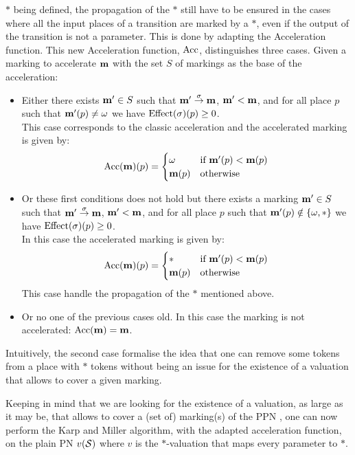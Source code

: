 $*$ being defined, the propagation of the $*$ still have to be ensured in the cases where all the input places of a transition are marked by a $*$, even if the output of the transition is not a parameter.
This is done by adapting the Acceleration function.
This new Acceleration function, $\operatorname{Acc}$, distinguishes three cases.
Given a marking to accelerate $\mathbf{m}$ with the set $S$ of markings as the base of the acceleration:
\begin{itemize}
  \item Either there exists $\mathbf{m'} \in S$ such that $\mathbf{m'} \stackrel{\sigma}{\to} \mathbf{m}$, $\mathbf{m'} < \mathbf{m}$, and for all place $p$ such that $\mathbf{m'}(p) \neq \omega$ we have $\operatorname{Effect}(\sigma)(p) \geq 0$.\\
    This case corresponds to the classic acceleration and
    the accelerated marking is given by:
    \[
      \operatorname{Acc}(\mathbf{m})(p) = \begin{cases} \omega &\text{if } \mathbf{m'}(p) < \mathbf{m}(p) \\ \mathbf{m}(p) &\text{otherwise} \end{cases}
    \]
  \item Or these first conditions does not hold but there exists a marking $\mathbf{m'} \in S$ such that $\mathbf{m'} \stackrel{\sigma}{\to} \mathbf{m}$, $\mathbf{m'} < \mathbf{m}$, and for all place $p$ such that $\mathbf{m'}(p) \notin \{\omega, *\}$ we have $\operatorname{Effect}(\sigma)(p) \geq 0$.\\
    In this case
    the accelerated marking is given by:
    \[
      \operatorname{Acc}(\mathbf{m})(p) = \begin{cases} * &\text{if } \mathbf{m'}(p) < \mathbf{m}(p) \\ \mathbf{m}(p) &\text{otherwise} \end{cases}
    \]
    This case handle the propagation of the $*$ mentioned above.
  \item Or no one of the previous cases old.
    In this case the marking is not accelerated: $\operatorname{Acc}(\mathbf{m}) = \mathbf{m}$.
\end{itemize}

Intuitively, the second case formalise the idea that one can remove some tokens from a place with $*$ tokens without being an issue for the existence of a valuation that allows to cover a given marking.

Keeping in mind that we are looking for the existence of a valuation, as large as it may be, that allows to cover a (set of) marking(s) of the \ac{PPN} \tupleS, one can now perform the Karp and Miller algorithm, with the adapted acceleration function, on the plain \ac{PN} $v(\mathcal{S})$ where $v$ is the $*$-valuation that maps every parameter to $*$.

